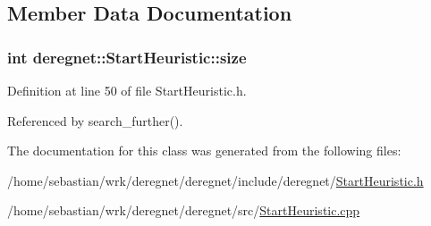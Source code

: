 \subsection{Member Data Documentation}
\subsubsection[{\texorpdfstring{size}{size}}]{\setlength{\rightskip}{0pt plus 5cm}int deregnet\+::\+Start\+Heuristic\+::size\hspace{0.3cm}{\ttfamily [private]}}\hypertarget{classderegnet_1_1StartHeuristic_acd3b3c6a5103491c252b774545ad470b}{}\label{classderegnet_1_1StartHeuristic_acd3b3c6a5103491c252b774545ad470b}


Definition at line 50 of file Start\+Heuristic.\+h.



Referenced by search\+\_\+further().



The documentation for this class was generated from the following files\+:\begin{DoxyCompactItemize}
\item 
/home/sebastian/wrk/deregnet/deregnet/include/deregnet/\hyperlink{StartHeuristic_8h}{Start\+Heuristic.\+h}\item 
/home/sebastian/wrk/deregnet/deregnet/src/\hyperlink{StartHeuristic_8cpp}{Start\+Heuristic.\+cpp}\end{DoxyCompactItemize}
